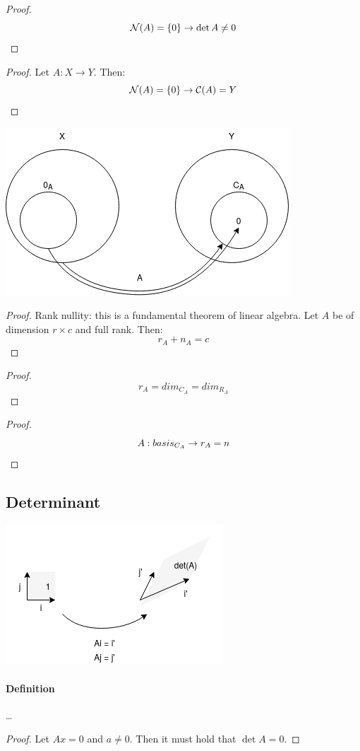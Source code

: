 \begin{proof}
    $$ \mathcal{N}(A) = \{ 0 \} \to \det{A} \neq 0 $$
\end{proof}

\begin{proof}
    Let $A: X \to Y$. Then:
    $$ \mathcal{N}(A) = \{ 0 \} \to \mathcal{C}(A) = Y $$
\end{proof}

\includegraphics[width=0.4\linewidth]{images/A_from_X_to_Y.png}

\begin{proof}
    Rank nullity: this is a fundamental theorem of linear algebra.
    Let $A$ be of dimension $r \times c$ and full rank.
    Then: 
    $$ r_A + n_A = c $$
\end{proof}


\begin{proof}
    $$ r_A = dim_{C_A} = dim_{R_A} $$
\end{proof}

\begin{proof}
    $$ A:basis_{C_A} \to r_A = n $$
\end{proof}


\subsection{Determinant}

\includegraphics[width=0.4\linewidth]{images/determinant.png}


\paragraph{Definition} \dots

\begin{proof} \label{det_0}
    Let $ A x = 0 $ and $ a \neq 0$. Then it must hold that $\det{A} = 0$.
\end{proof}

